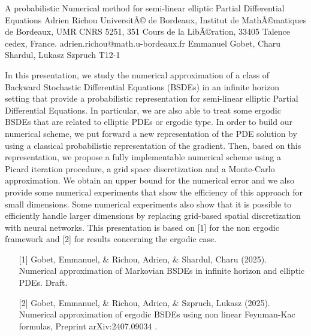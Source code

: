 \begin{talk}
  {A probabilistic Numerical method for semi-linear elliptic Partial Differential Equations}%
  {Adrien Richou}%
  {UniversitÃ© de Bordeaux, Institut de MathÃ©matiques de Bordeaux, UMR CNRS 5251,
  351 Cours de la LibÃ©ration, 33405 Talence cedex, France.}%
  {adrien.richou@math.u-bordeaux.fr}%
  {Emmanuel Gobet, Charu Shardul, Lukasz Szpruch}%
  {T12-1}%
			
In this presentation, we study the numerical approximation of a class of Backward Stochastic Differential Equations (BSDEs) in an infinite horizon setting that provide a probabilistic representation for semi-linear elliptic Partial Differential Equations. In particular, we are also able to treat some ergodic BSDEs that are related to elliptic PDEs or ergodic type. In order to build our numerical scheme, we put forward a new representation of the PDE solution by using a classical probabilistic representation of the gradient. Then, based on this representation, we propose a fully implementable numerical scheme using a Picard iteration procedure, a grid space discretization and a Monte-Carlo approximation. We obtain an upper bound for the numerical error and we also provide some numerical experiments that show the
efficiency of this approach for small dimensions. Some numerical experiments also show that it is possible to efficiently handle larger dimensions by replacing grid-based spatial discretization with neural networks. This presentation is based on [1] for the non ergodic framework and [2] for results concerning the ergodic case.

\medskip

\begin{enumerate}
	\item[{[1]}] Gobet, Emmanuel, \& Richou, Adrien, \& Shardul, Charu (2025). Numerical approximation of Markovian BSDEs in infinite
  horizon and elliptic PDEs. Draft.
	\item[{[2]}] Gobet, Emmanuel, \& Richou, Adrien, \& Szpruch, Lukasz (2025).  Numerical approximation of ergodic BSDEs using non
  linear Feynman-Kac formulas, Preprint arXiv:2407.09034 .
\end{enumerate}

\end{talk}

